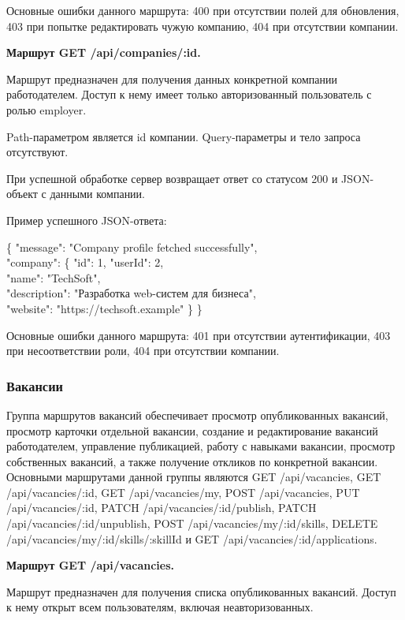 Основные ошибки данного маршрута: 400 при отсутствии полей для обновления, 403 при попытке редактировать чужую компанию, 404 при отсутствии компании.

\textbf{Маршрут GET /api/companies/:id.}

Маршрут предназначен для получения данных конкретной компании работодателем. Доступ к нему имеет только авторизованный пользователь с ролью employer.

Path-параметром является id компании. Query-параметры и тело запроса отсутствуют.

При успешной обработке сервер возвращает ответ со статусом 200 и JSON-объект с данными компании.

Пример успешного JSON-ответа:

\begin{flushleft}
	\small\ttfamily
	\{ "message": "Company profile fetched successfully",\\
	"company": \{ "id": 1, "userId": 2,\\
	"name": "TechSoft",\\
	"description": "Разработка web-систем для бизнеса",\\
	"website": "https://techsoft.example" \} \}
\end{flushleft}

Основные ошибки данного маршрута: 401 при отсутствии аутентификации, 403 при несоответствии роли, 404 при отсутствии компании.

\subsubsection{Вакансии}

Группа маршрутов вакансий обеспечивает просмотр опубликованных вакансий, просмотр карточки отдельной вакансии, создание и редактирование вакансий работодателем, управление публикацией, работу с навыками вакансии, просмотр собственных вакансий, а также получение откликов по конкретной вакансии. Основными маршрутами данной группы являются GET /api/vacancies, GET /api/vacancies/:id, GET /api/vacancies/my, POST /api/vacancies, PUT /api/vacancies/:id, PATCH /api/vacancies/:id/publish, PATCH /api/vacancies/:id/unpublish, POST /api/vacancies/my/:id/skills, DELETE /api/vacancies/my/:id/skills/:skillId и GET /api/vacancies/:id/applications.

\textbf{Маршрут GET /api/vacancies.}

Маршрут предназначен для получения списка опубликованных вакансий. Доступ к нему открыт всем пользователям, включая неавторизованных.

